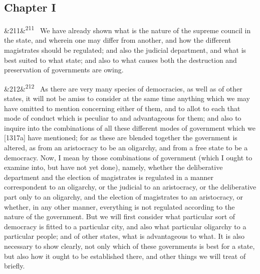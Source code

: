\documentclass[12pt]{article}
\newcommand{\para}[1][]{\par\noindent\ifx&#1&\else\textsuperscript{\footnotesize #1}~\fi}
\begin{document}
\subsection*{Chapter I}

\para[211] We have already shown what is the nature of the supreme council in the state, and wherein one may differ from another, and how the different magistrates should be regulated; and also the judicial department, and what is best suited to what state; and also to what causes both the destruction and preservation of governments are owing.

\para[212] As there are very many species of democracies, as well as of other states, it will not be amiss to consider at the same time anything which we may have omitted to mention concerning either of them, and to allot to each that mode of conduct which is peculiar to and advantageous for them; and also to inquire into the combinations of all these different modes of government which we [1317a] have mentioned; for as these are blended together the government is altered, as from an aristocracy to be an oligarchy, and from a free state to be a democracy. Now, I mean by those combinations of government (which I ought to examine into, but have not yet done), namely, whether the deliberative department and the election of magistrates is regulated in a manner correspondent to an oligarchy, or the judicial to an aristocracy, or the deliberative part only to an oligarchy, and the election of magistrates to an aristocracy, or whether, in any other manner, everything is not regulated according to the nature of the government. But we will first consider what particular sort of democracy is fitted to a particular city, and also what particular oligarchy to a particular people; and of other states, what is advantageous to what. It is also necessary to show clearly, not only which of these governments is best for a state, but also how it ought to be established there, and other things we will treat of briefly.
\end{document}
